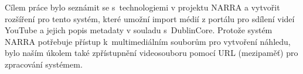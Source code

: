 \documentclass[thesis=B,czech]{FITthesis}[2012/06/26]
\begin{document}
\begin{conclusion}
	\par Cílem práce bylo seznámit se s~technologiemi v projektu NARRA a vytvořit rozšíření pro tento systém, které umožní import médií z portálu pro sdílení videí YouTube a jejich popis metadaty v souladu s~DublinCore. Protože systém NARRA potřebuje přístup k~multimediálním souborům pro vytvoření náhledu, bylo naším úkolem také zpřístupnění videosouboru pomocí URL (mezipaměť) pro zpracování systémem. 

\end{conclusion}
\end{document}
